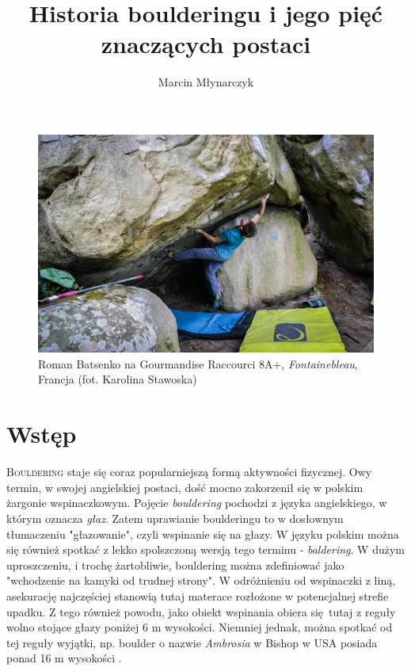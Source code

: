 \documentclass{article}
\title{Historia boulderingu i jego pięć znaczących postaci}
\author{Marcin Młynarczyk}
\date{\displaydate{date}}
\begin{document}
\maketitle
\tableofcontents

\bigskip

\begin{figure}[!htbp]
	\begin{center}
		\includegraphics[width=0.7\linewidth]{images/intro.eps}
	\end{center}
	\caption{Roman Batsenko na Gourmandise Raccourci 8A+, \textit{Fontainebleau}, Francja (fot. Karolina Stawoska) \cite{8a}}
\end{figure}

\section{Wstęp}
\lettrine[lines=2]{B}{ouldering} staje się coraz popularniejszą formą aktywności fizycznej. Owy termin, w swojej angielskiej postaci, dość mocno zakorzenił się w polskim żargonie wspinaczkowym. Pojęcie \textit{bouldering} pochodzi z języka angielskiego, w którym oznacza \textit{głaz}. Zatem uprawianie boulderingu to w dosłownym tłumaczeniu "głazowanie", czyli wspinanie się na głazy. W języku polskim można się również spotkać z lekko spolszczoną wersją tego terminu - \textit{baldering}. W dużym uproszczeniu, i trochę żartobliwie, bouldering można zdefiniować jako "wchodzenie na kamyki od trudnej strony". W odróżnieniu od wspinaczki z liną, asekurację najczęściej stanowią tutaj materace rozłożone w potencjalnej strefie upadku. Z tego również powodu, jako obiekt wspinania obiera się tutaj z reguły wolno stojące głazy poniżej 6 m wysokości. Niemniej jednak, można spotkać od tej reguły wyjątki, np. boulder o nazwie \textit{Ambrosia} w Bishop w USA posiada ponad 16 m wysokości \cite{ambrosia}.
\end{document}
